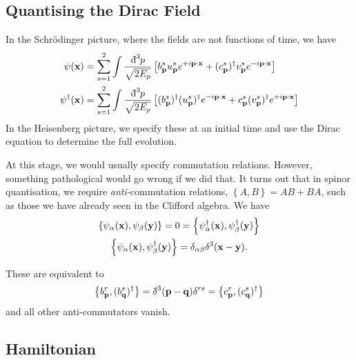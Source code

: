 \subsection{Quantising the Dirac Field}%
\label{sub:quantising_the_dirac_field}

In the Schrödinger picture, where the fields are not functions of time, we have
\begin{align}
  \psi(\vb{x}) &= \sum_{s=1}^{2} \int \frac{\bdd[3]{p}}{\sqrt{2E_{p}}} \left[ b_{\vb{p}}^{s} u^{s}_{\vb{p}} e^{+i \vb{p} \cdot \vb{x}} + (c_{\vb{p}}^{s})^{\dagger} v_{\vb{p}}^{s} e^{-i \vb{p} \cdot \vb{x}} \right] \\
  \psi^{\dagger}(\vb{x}) &= \sum_{s=1}^{2} \int \frac{\bdd[3]{p}}{\sqrt{2E_{p}}} \left[ (b_{\vb{p}}^{s})^{\dagger} (u^{s}_{\vb{p}})^{\dagger} e^{-i \vb{p} \cdot \vb{x}} + c_{\vb{p}}^{s} (v_{\vb{p}}^{s})^{\dagger} e^{+i \vb{p} \cdot \vb{x}} \right] \\
\end{align}
In the Heisenberg picture, we specify these at an initial time and use the Dirac equation to determine the full evolution.

At this stage, we would usually specify commutation relations. However, something pathological would go wrong if we did that.
It turns out that in spinor quantisation, we require \emph{anti-}commutation relations, $\left\{ A, B \right\} = AB + BA$, such as those we have already seen in the Clifford algebra.
We have
\begin{subequations} \label{eq:16-anticommrels}
  \begin{gather}
    \left\{ \psi_{\alpha}(\vb{x}), \psi_{\beta}(\vb{y}) \right\} = 0 = \left\{ \psi^{\dagger}_{\alpha}(\vb{x}), \psi^{\dagger}_{\beta}(\vb{y}) \right\} \\
    \left\{ \psi_{\alpha}(\vb{x}) , \psi^{\dagger}_{\beta}(\vb{y}) \right\} = \delta_{\alpha\beta} \delta^3 (\vb{x} - \vb{y}).
  \end{gather}
\end{subequations}
\begin{claim}
  These are equivalent to
  \begin{equation}
    \left\{ b_{\vb{p}}^{r}, (b^{s}_{\vb{q}})^{\dagger} \right\} = \bdelta^3(\vb{p} - \vb{q}) \delta^{rs} = \left\{ c^{r}_{\vb{p}}, (c_{\vb{q}}^{s})^{\dagger} \right\}
  \end{equation}
  and all other anti-commutators vanish.
\end{claim}

\subsection*{Hamiltonian}%

